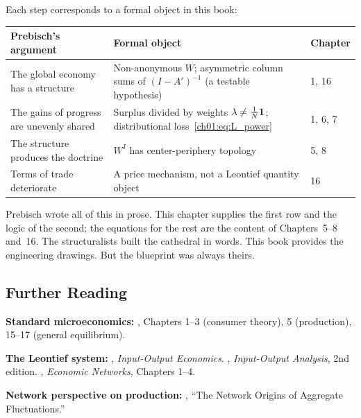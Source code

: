 \documentclass[../structural_economics_book.tex]{subfiles}
\begin{document}
Each step corresponds to a formal object in this book:

\begin{center}
\begin{tabularx}{\textwidth}{LLL}
\toprule
\textbf{Prebisch's argument} & \textbf{Formal object} & \textbf{Chapter} \\
\midrule
The global economy has a structure & Non-anonymous $W$; asymmetric column sums of $(I-A')^{-1}$ (a testable hypothesis) & 1, 16 \\
The gains of progress are unevenly shared & Surplus divided by weights $\lambda \neq \frac{1}{N}\mathbf{1}$; distributional loss~\eqref{ch01:eq:L_power} & 1, 6, 7 \\
The structure produces the doctrine & $W^I$ has center-periphery topology & 5, 8 \\
Terms of trade deteriorate & A price mechanism, not a Leontief quantity object & 16 \\
\bottomrule
\end{tabularx}
\end{center}

Prebisch wrote all of this in prose. This chapter supplies the first row and the logic of the second; the equations for the rest are the content of Chapters~5--8 and~16. The structuralists built the cathedral in words. This book provides the engineering drawings. But the blueprint was always theirs.


\subsection*{Further Reading}

\textbf{Standard microeconomics:} \citet{mascolell1995microeconomic}, Chapters 1--3 (consumer theory), 5 (production), 15--17 (general equilibrium).

\textbf{The Leontief system:} \citet{leontief1986inputoutput}, \textit{Input-Output Economics}. \citet{miller2009inputoutput}, \textit{Input-Output Analysis}, 2nd edition. \citet{sargent2024economic}, \textit{Economic Networks}, Chapters 1--4.

\begin{sloppypar}\textbf{Network perspective on production:} \citet{acemoglu2012network}, ``The Network Origins of Aggregate Fluctuations.''\end{sloppypar}
\end{document}
